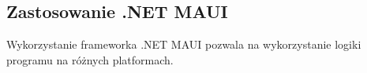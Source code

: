 \subsection{Zastosowanie .NET MAUI}

Wykorzystanie frameworka .NET MAUI pozwala na wykorzystanie logiki programu na różnych platformach.
